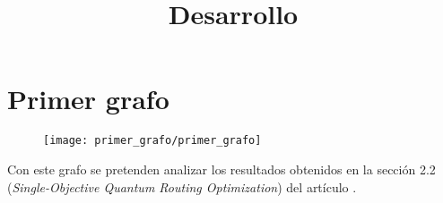 \documentclass{article}
\title{Desarrollo}
\begin{document}
\maketitle{}

\section{Primer grafo}  %
\label{sec:4-primer grafo}

\begin{figure}[htbp]
  \centering
  \texttt{[image: primer\_grafo/primer\_grafo]}
\end{figure}

Con este grafo se pretenden analizar los resultados obtenidos en la sección 2.2 (\textit{Single-Objective Quantum Routing Optimization}) del artículo \cite{multi-objective_routing_optimization}.
\end{document}
